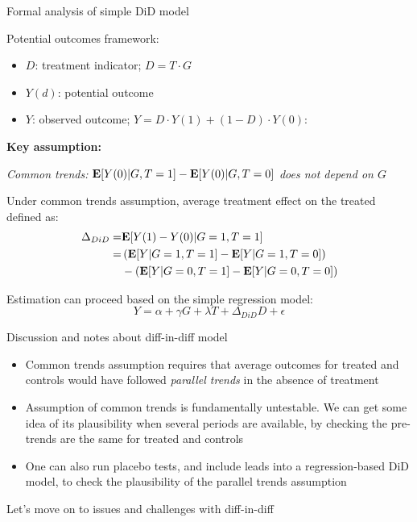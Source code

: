 \documentclass[compress, 8pt]{beamer}
\begin{document}
\begin{frame}{Formal analysis of simple DiD model}

Potential outcomes framework:
\begin{itemize}
    \item $D$: treatment indicator; $D = T \cdot G$
    \item $Y (d)$: potential outcome
    \item $Y$: observed outcome; $Y = D \cdot Y(1) + (1 - D) \cdot Y(0)$: 
\end{itemize}

\vspace{3ex}
\textbf{Key assumption: }

\emph{Common trends: $\mathbf{E} [Y (0) \vert G, T = 1] - \mathbf{E} [Y(0) \vert G, T=0]$ does not depend on $G$}

\vspace{3ex}
Under common trends assumption, average treatment effect on the treated defined as:
\begin{align*}
\Delta_{DiD} =& \mathbf{E} [Y (1) - Y(0) \vert G=1, T=1] \\
=& \left(\mathbf{E} [Y \vert G = 1, T = 1] - \mathbf{E} [Y \vert G = 1, T= 0]\right) \\
&- \left( \mathbf{E} [Y \vert G = 0, T = 1] - \mathbf{E} [Y \vert G =0, T = 0] \right)
\end{align*}

Estimation can proceed based on the simple regression model:
\begin{equation*}
    Y = \alpha + \gamma G + \lambda T + \Delta_{DiD} D + \epsilon
\end{equation*}

\end{frame}

\begin{frame}{Discussion and notes about diff-in-diff model}

\begin{itemize}
\item Common trends assumption requires that average outcomes for treated and controls would have followed \emph{parallel trends} in the absence of treatment

\vspace{4ex}
\item Assumption of common trends is fundamentally untestable. We can get some idea of its plausibility when several periods are available, by checking the pre-trends are the same for treated and controls

\vspace{4ex}
\item One can also run placebo tests, and include leads into a regression-based DiD model, to check the plausibility of the parallel trends assumption

\end{itemize}

\vspace{2ex} Let's move on to issues and challenges with diff-in-diff

\end{frame}
\end{document}
